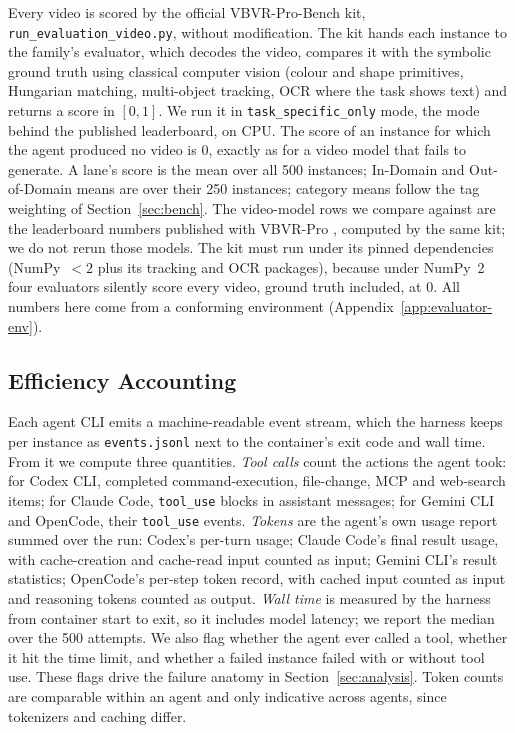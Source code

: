 Every video is scored by the official VBVR-Pro-Bench kit, \texttt{run\_evaluation\_video.py}, without modification. The kit hands each instance to the family's evaluator, which decodes the video, compares it with the symbolic ground truth using classical computer vision (colour and shape primitives, Hungarian matching, multi-object tracking, OCR where the task shows text) and returns a score in $[0,1]$. We run it in \texttt{task\_specific\_only} mode, the mode behind the published leaderboard, on CPU. The score of an instance for which the agent produced no video is 0, exactly as for a video model that fails to generate. A lane's score is the mean over all 500 instances; In-Domain and Out-of-Domain means are over their 250 instances; category means follow the tag weighting of Section~\ref{sec:bench}. The video-model rows we compare against are the leaderboard numbers published with VBVR-Pro \citep{vbvrpro2026}, computed by the same kit; we do not rerun those models. The kit must run under its pinned dependencies (NumPy~$<2$ plus its tracking and OCR packages), because under NumPy~2 four evaluators silently score every video, ground truth included, at 0. All numbers here come from a conforming environment (Appendix~\ref{app:evaluator-env}).

\subsection{Efficiency Accounting}
\label{sec:efficiency}

Each agent CLI emits a machine-readable event stream, which the harness keeps per instance as \texttt{events.jsonl} next to the container's exit code and wall time. From it we compute three quantities. \emph{Tool calls} count the actions the agent took: for Codex CLI, completed command-execution, file-change, MCP and web-search items; for Claude Code, \texttt{tool\_use} blocks in assistant messages; for Gemini CLI and OpenCode, their \texttt{tool\_use} events. \emph{Tokens} are the agent's own usage report summed over the run: Codex's per-turn usage; Claude Code's final result usage, with cache-creation and cache-read input counted as input; Gemini CLI's result statistics; OpenCode's per-step token record, with cached input counted as input and reasoning tokens counted as output. \emph{Wall time} is measured by the harness from container start to exit, so it includes model latency; we report the median over the 500 attempts. We also flag whether the agent ever called a tool, whether it hit the time limit, and whether a failed instance failed with or without tool use. These flags drive the failure anatomy in Section~\ref{sec:analysis}. Token counts are comparable within an agent and only indicative across agents, since tokenizers and caching differ.
